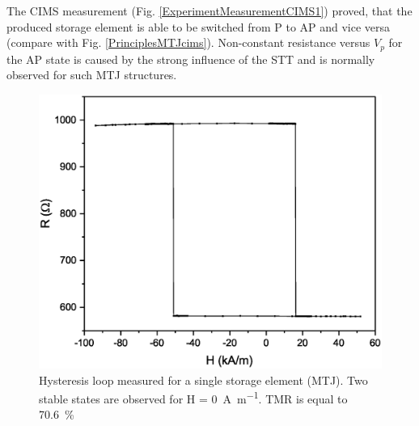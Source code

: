     The CIMS measurement (Fig. \ref{ExperimentMeasurementCIMS1}) proved, that the produced storage element is able to be switched from P to AP and vice versa (compare with Fig. \ref{PrinciplesMTJcims}). Non-constant resistance versus $V_p$ for the AP state is caused by the strong influence of the STT and is normally observed for such MTJ structures. 
    
    \begin{figure}[H]
        \centering
        \includegraphics[width=0.75\paperwidth]{img/05/ResultsTMR.eps}
        \caption{Hysteresis loop measured for a single storage element (MTJ). Two stable states are observed for \SI[parse-numbers = false, number-math-rm = \ensuremath, per-mode=symbol]{H = 0}{\ampere\per\metre}. TMR is equal to \SI{70.6}{\percent}}
        \label{ExperimentMeasurementTMRSingle}
    \end{figure}
    
